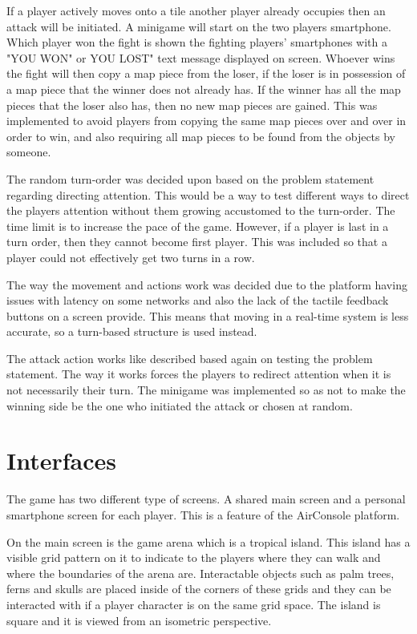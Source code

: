 If a player actively moves onto a tile another player already occupies then an attack will be initiated. A minigame will start on the two players smartphone. Which player won the fight is shown the fighting players' smartphones with a "YOU WON" or YOU LOST" text message displayed on screen. Whoever wins the fight will then copy a map piece from the loser, if the loser is in possession of a map piece that the winner does not already has. If the winner has all the map pieces that the loser also has, then no new map pieces are gained. This was implemented to avoid players from copying the same map pieces over and over in order to win, and also requiring all map pieces to be found from the objects by someone.

The random turn-order was decided upon based on the problem statement regarding directing attention. This would be a way to test different ways to direct the players attention without them growing accustomed to the turn-order. The time limit is to increase the pace of the game. However, if a player is last in a turn order, then they cannot become first player. This was included so that a player could not effectively get two turns in a row.

The way the movement and actions work was decided due to the platform having issues with latency on some networks and also the lack of the tactile feedback buttons on a screen provide. This means that moving in a real-time system is less accurate, so a turn-based structure is used instead.

The attack action works like described based again on testing the problem statement. The way it works forces the players to redirect attention when it is not necessarily their turn. The minigame was implemented so as not to make the winning side be the one who initiated the attack or chosen at random.

\section{Interfaces}
The game has two different type of screens. A shared main screen and a personal smartphone screen for each player. This is a feature of the AirConsole platform.

On the main screen is the game arena which is a tropical island. This island has a visible grid pattern on it to indicate to the players where they can walk and where the boundaries of the arena are. Interactable objects such as palm trees, ferns and skulls are placed inside of the corners of these grids and they can be interacted with if a player character is on the same grid space. The island is square and it is viewed from an isometric perspective. 

